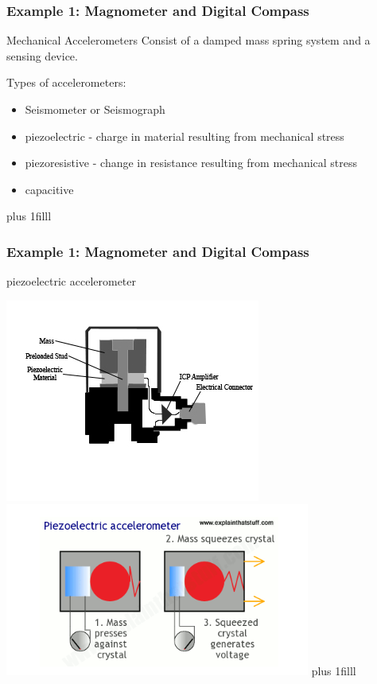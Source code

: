 \documentclass[fleqn]{beamer} %
\newcommand{\sectionIIsubsectionIIItitle}{Example 1: Magnometer and Digital Compass}
\newcommand{\btVFill}{\vskip0pt plus 1filll}
\begin{document}
			\begin{frame}
			\frametitle{\sectionIIsubsectionIIItitle}

				Mechanical Accelerometers Consist of a damped mass spring system and a sensing device.
	
			 	Types of accelerometers:

			 	\begin{itemize}
			 		
			 		\item Seismometer or Seismograph

			 		\item piezoelectric - charge in material resulting from mechanical stress

			 		\item piezoresistive - change in resistance resulting from mechanical stress

			 		\item capacitive 

			 	\end{itemize}

			 
			    \btVFill

			\end{frame}

			\begin{frame}
			\frametitle{\sectionIIsubsectionIIItitle}

				piezoelectric accelerometer                                
 
			 	\includegraphics[scale=3.5]{images/PiezoAccel.jpg} 
			 	\includegraphics[scale=.55]{images/Piezoelectric.png}
			    \btVFill

			\end{frame}
\end{document}
